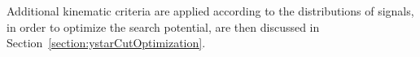 Additional kinematic criteria are applied according to the distributions of signals, in order to optimize the
search potential, are then discussed in Section~\ref{section:ystarCutOptimization}.



\begin{comment}
\subsection{Analysis cutflow}

This section and the next present the analysis cutflows. Cutflows obtained on
Run~2 data are presented in Tables~\ref{tab:cutFlow_resonance_run2} and 
\ref{tab:cutFlow_wstar_run2}.

\begin{table}[htbp]
	\centering
	\begin{tabular}{l|c|c}
		\hline\hline
		Selection criteria & $N_{events}$ & rel. decrease (\%) \\
		\hline
		all      &	4738142726	&	0.00	\\
		Apply GRL 	& 	4442605390        & 	-6.24	 \\
		Cleaning	 & 	4379077017	 & 	-1.43	 \\
		HLT j420	 & 	266104885	 & 	-93.9	 \\
		jet pre-selection	 &     259157844         &      -2.61    \\
		$|\Delta\phi| > 1.0$	 & 		 & 		 \\
		$|\ystar| < 0.6$	 & 		 & 		 \\
		$\mjj>1100~\GeV$	 & 		 & 		 \\
		\hline\hline
	\end{tabular}
	\caption{Cutflow for
		events with H$^\prime$ cuts:  $\mjj>1100~\GeV$, and $|\ystar|<0.6$. .
		\label{tab:cutFlow_resonance_run2} }
\end{table}

\begin{table}[htbp]
	\centering
	\begin{tabular}{l|c|c}
		\hline\hline
		Selection criteria & $N_{events}$ & rel. decrease (\%) \\
		\hline
		all      &	4738142726	&	0.00	\\
		Apply GRL 	& 	4442605390        & 	-6.24	 \\
		Cleaning	 & 	4379077017	 & 	-1.43	 \\
		HLT j420	 & 	266104885	 & 	-93.9	 \\
		jet pre-selection	 &     259157844        &      -2.61    \\
		$|\Delta\phi| > 1.0$	 & 		 & 		 \\
		$|\ystar| < 0.8$	 & 		 & 	 \\
		$\mjj>1133~\GeV$	 & 		 & 	 \\
		\hline\hline
	\end{tabular}
	\caption{Cutflow for
		events with string resonance cuts:  $\mjj>1133~\GeV$, and $|\ystar|<0.8$. .
		\label{tab:cutFlow_wstar_run2} }
\end{table}
\end{comment}
